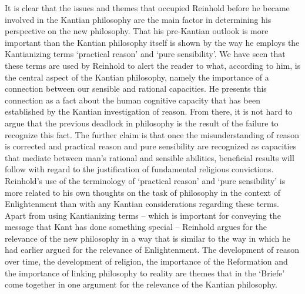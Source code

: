 It is clear that the issues and themes that occupied Reinhold before he became involved in the Kantian philosophy are the main factor in determining his perspective on the new philosophy. That his pre{-}Kantian outlook is more important than the Kantian philosophy itself is shown by the way he employs the Kantianizing terms `practical reason' and `pure sensibility'. We have seen that these terms are used by Reinhold to alert the reader to what, according to him, is the central aspect of the Kantian philosophy, namely the importance of a connection between our sensible and rational capacities. He presents this connection as a fact about the human cognitive capacity that has been established by the Kantian investigation of reason. From there, it is not hard to argue that the previous deadlock in philosophy is the result of the failure to recognize this fact. The further claim is that once the misunderstanding of reason is corrected and practical reason and pure sensibility are recognized as capacities that mediate between man's rational and sensible abilities, beneficial results will follow with regard to the justification of fundamental religious convictions. Reinhold's use of the terminology of `practical reason' and `pure sensibility' is more related to his own thoughts on the task of philosophy in the context of Enlightenment than with any Kantian considerations regarding these terms. Apart from using Kantianizing terms {--} which is important for conveying the message that Kant has done something special {--} Reinhold argues for the relevance of the new philosophy in a way that is similar to the way in which he had earlier argued for the relevance of Enlightenment. The development of reason over time, the development of religion, the importance of the Reformation and the importance of linking philosophy to reality are themes that in the `Briefe' come together in one argument for the relevance of the Kantian philosophy. 

